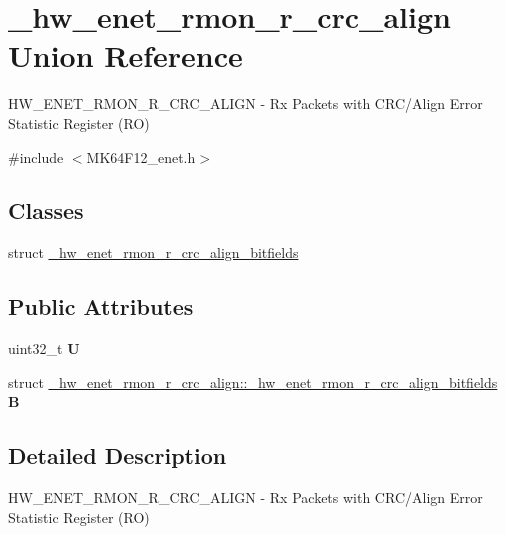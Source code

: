 \hypertarget{union__hw__enet__rmon__r__crc__align}{}\section{\+\_\+hw\+\_\+enet\+\_\+rmon\+\_\+r\+\_\+crc\+\_\+align Union Reference}
\label{union__hw__enet__rmon__r__crc__align}


H\+W\+\_\+\+E\+N\+E\+T\+\_\+\+R\+M\+O\+N\+\_\+\+R\+\_\+\+C\+R\+C\+\_\+\+A\+L\+I\+GN -\/ Rx Packets with C\+R\+C/\+Align Error Statistic Register (RO)  




{\ttfamily \#include $<$M\+K64\+F12\+\_\+enet.\+h$>$}

\subsection*{Classes}
\begin{DoxyCompactItemize}
\item 
struct \hyperlink{struct__hw__enet__rmon__r__crc__align_1_1__hw__enet__rmon__r__crc__align__bitfields}{\+\_\+hw\+\_\+enet\+\_\+rmon\+\_\+r\+\_\+crc\+\_\+align\+\_\+bitfields}
\end{DoxyCompactItemize}
\subsection*{Public Attributes}
\begin{DoxyCompactItemize}
\item 
uint32\+\_\+t {\bfseries U}\hypertarget{union__hw__enet__rmon__r__crc__align_afe5b3b4b15e2d1ae47e2dfa5b03b01ca}{}\label{union__hw__enet__rmon__r__crc__align_afe5b3b4b15e2d1ae47e2dfa5b03b01ca}

\item 
struct \hyperlink{struct__hw__enet__rmon__r__crc__align_1_1__hw__enet__rmon__r__crc__align__bitfields}{\+\_\+hw\+\_\+enet\+\_\+rmon\+\_\+r\+\_\+crc\+\_\+align\+::\+\_\+hw\+\_\+enet\+\_\+rmon\+\_\+r\+\_\+crc\+\_\+align\+\_\+bitfields} {\bfseries B}\hypertarget{union__hw__enet__rmon__r__crc__align_a6e31e751115b1d62d7ce84956df449f1}{}\label{union__hw__enet__rmon__r__crc__align_a6e31e751115b1d62d7ce84956df449f1}

\end{DoxyCompactItemize}


\subsection{Detailed Description}
H\+W\+\_\+\+E\+N\+E\+T\+\_\+\+R\+M\+O\+N\+\_\+\+R\+\_\+\+C\+R\+C\+\_\+\+A\+L\+I\+GN -\/ Rx Packets with C\+R\+C/\+Align Error Statistic Register (RO) 


